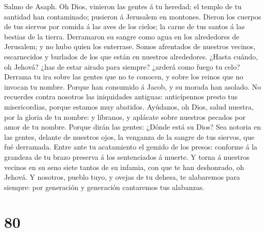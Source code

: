 Salmo de Asaph. Oh Dios, vinieron las gentes á tu
heredad; el templo de tu santidad han contaminado; pusieron á Jerusalem
en montones.  Dieron los cuerpos de tus siervos por comida
á las aves de los cielos; la carne de tus santos á las bestias de la
tierra.  Derramaron su sangre como agua en los alrededores
de Jerusalem; y no hubo quien los enterrase.  Somos
afrentados de nuestros vecinos, escarnecidos y burlados de los que están
en nuestros alrededores.  ¿Hasta cuándo, oh Jehová? ¿has
de estar airado para siempre? ¿arderá como fuego tu celo? 
Derrama tu ira sobre las gentes que no te conocen, y sobre los reinos
que no invocan tu nombre.  Porque han consumido á Jacob, y
su morada han asolado.  No recuerdes contra nosotros las
iniquidades antiguas: anticípennos presto tus misericordias, porque
estamos muy abatidos.  Ayúdanos, oh Dios, salud nuestra,
por la gloria de tu nombre: y líbranos, y aplácate sobre nuestros
pecados por amor de tu nombre.  Porque dirán las gentes:
¿Dónde está su Dios? Sea notoria en las gentes, delante de nuestros
ojos, la venganza de la sangre de tus siervos, que fué derramada.
 Entre ante tu acatamiento el gemido de los presos:
conforme á la grandeza de tu brazo preserva á los sentenciados á muerte.
 Y torna á nuestros vecinos en su seno siete tantos de su
infamia, con que te han deshonrado, oh Jehová.  Y
nosotros, pueblo tuyo, y ovejas de tu dehesa, te alabaremos para
siempre: por generación y generación cantaremos tus alabanzas.

\hypertarget{section-79}{%
\section{80}\label{section-79}}

